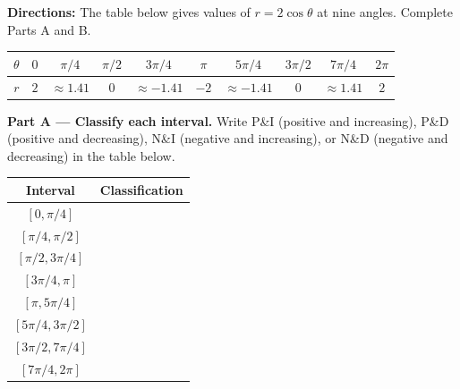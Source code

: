 \documentclass[10pt]{article}
\begin{document}
\begin{tcolorbox}[colback=white, colframe=black!40,
    title=\textbf{Tier R --- Reinforce},
    fonttitle=\bfseries, arc=2mm, left=3mm, right=3mm, top=2mm, bottom=2mm]

\textbf{Directions:} The table below gives values of $r = 2\cos\theta$ at nine angles.
Complete Parts A and B.

\vspace{6pt}
\renewcommand{\arraystretch}{1.5}
\begin{tabular}{|c|c|c|c|c|c|c|c|c|c|}
\hline
$\theta$ & $0$ & $\pi/4$ & $\pi/2$ & $3\pi/4$ & $\pi$ & $5\pi/4$ & $3\pi/2$ & $7\pi/4$ & $2\pi$ \\
\hline
$r$ & $2$ & $\approx 1.41$ & $0$ & $\approx -1.41$ & $-2$ & $\approx -1.41$ & $0$ & $\approx 1.41$ & $2$ \\
\hline
\end{tabular}

\vspace{8pt}
\textbf{Part A --- Classify each interval.}
Write P\&I (positive and increasing), P\&D (positive and decreasing),
N\&I (negative and increasing), or N\&D (negative and decreasing)
in the table below.

\vspace{4pt}
\renewcommand{\arraystretch}{1.6}
\begin{tabular}{|c|p{4.5cm}|}
\hline
\textbf{Interval} & \textbf{Classification} \\
\hline
$[0, \pi/4]$ & \underline{\hspace{4cm}} \\
\hline
$[\pi/4, \pi/2]$ & \underline{\hspace{4cm}} \\
\hline
$[\pi/2, 3\pi/4]$ & \underline{\hspace{4cm}} \\
\hline
$[3\pi/4, \pi]$ & \underline{\hspace{4cm}} \\
\hline
$[\pi, 5\pi/4]$ & \underline{\hspace{4cm}} \\
\hline
$[5\pi/4, 3\pi/2]$ & \underline{\hspace{4cm}} \\
\hline
$[3\pi/2, 7\pi/4]$ & \underline{\hspace{4cm}} \\
\hline
$[7\pi/4, 2\pi]$ & \underline{\hspace{4cm}} \\
\hline
\end{tabular}


\end{tcolorbox}
\end{document}
